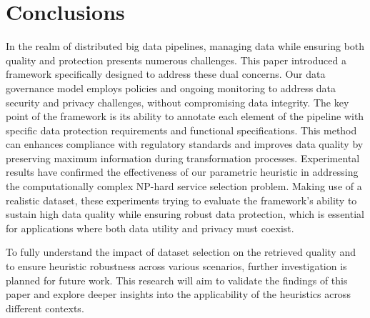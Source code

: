 \documentclass[sn-mathphys-num,referee]{sn-jnl}
\theoremstyle{definition}
\begin{document}










\section{Conclusions}\label{sec:conclusions}
In the realm of distributed big data pipelines, managing data while ensuring both quality and protection presents numerous challenges.
This paper introduced a framework specifically designed to address these dual concerns.
Our data governance model employs policies and ongoing monitoring to address data security and privacy challenges, without compromising data integrity.
The key point of the framework is its ability to annotate each element of the pipeline with specific data protection requirements and functional specifications.
This method can enhances compliance with regulatory standards and improves data quality by preserving maximum information during transformation processes.
Experimental results have confirmed the effectiveness of our parametric heuristic in addressing the computationally complex NP-hard service selection problem.
Making use of a realistic dataset, these experiments trying to evaluate the framework’s ability to sustain high data quality while ensuring robust data protection, which is essential for applications where both data utility and privacy must coexist.

To fully understand the impact of dataset selection on the retrieved quality and to ensure heuristic robustness across various scenarios, further investigation is planned for future work.
This research will aim to validate the findings of this paper and explore deeper insights into the applicability of the heuristics across different contexts.


\clearpage
\end{document}
